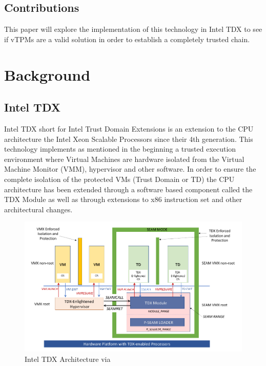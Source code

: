 \documentclass[sigplan,screen,nonacm]{acmart}
\begin{document}
\subsection{Contributions}

This paper will explore the implementation of this technology in Intel TDX to see if vTPMs are a valid solution in order to establish a completely trusted chain.

\section{Background}

\subsection{Intel TDX}
Intel TDX short for Intel Trust Domain Extensions is an extension to the CPU architecture the Intel Xeon Scalable Processors since their 4th generation\cite{Intel-TDX-support}.
This technology implements as mentioned in the beginning a trusted execution environment where Virtual Machines are hardware isolated from the Virtual Machine Monitor (VMM), hypervisor and other software.
In order to ensure the complete isolation of the protected VMs (Trust Domain or TD) the CPU architecture has been extended through a software based component called the TDX Module as well as through extensions to x86 instruction set and other architectural changes.

\begin{figure}
  \centering
  \includegraphics[width=\linewidth]{pictures/Intel_TDX_Architecture.png}
  \caption{Intel TDX Architecture via \cite{cheng2023intel}}
  \label{fig:tdxarch}
\end{figure}
\end{document}
